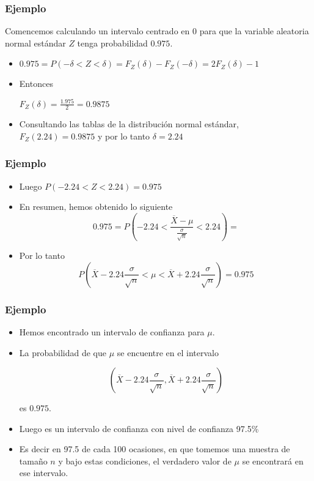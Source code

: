 \begin{frame}
 
\frametitle{Ejemplo}
    Comencemos calculando un intervalo centrado en $0$ para que la variable aleatoria normal estándar $Z$
    tenga probabilidad $0.975$.
\begin{itemize}
\item  $0.975= P(-\delta<Z<\delta)=F_{Z}(\delta)-F_{Z}(-\delta)=
   2 F_{Z}(\delta)-1$
\item    Entonces

  $F_{Z}(\delta)=\frac{1.975}{2}=0.9875$
\item  Consultando las tablas de la distribución normal estándar,
$F_{Z}(2.24)=0.9875$ y por lo tanto $\delta=2.24$
\end{itemize}
\end{frame}


\begin{frame}
 
\frametitle{Ejemplo}
\begin{itemize}
\item  Luego $P(-2.24<Z<2.24)=0.975$
\item En resumen, hemos obtenido lo siguiente
    $$0.975=P\left(-2.24<\frac{\overline{X}-\mu}{\frac{\sigma}{\sqrt{n}}}<2.24\right)=$$
\item  Por lo tanto 
$$P\left(\overline{X} -2.24 \frac{\sigma}{\sqrt{n}}< \mu< \overline{X}+
    2.24\frac{\sigma}{\sqrt{n}}\right)=0.975$$
\end{itemize}
\end{frame}

\begin{frame}
\frametitle{Ejemplo}
\begin{itemize}
\item Hemos encontrado un intervalo de confianza para $\mu$.
\item La probabilidad de que $\mu$ se encuentre en el intervalo

    $$\left(\overline{X} -2.24 \frac{\sigma}{\sqrt{n}},
    \overline{X}+
    2.24\frac{\sigma}{\sqrt{n}}\right)$$

    es $0.975$.
\item Luego es un intervalo de confianza con nivel de confianza 97.5\%
\item Es decir en 97.5 de cada 100 ocasiones, en que tomemos una muestra de tamaño $n$ y bajo estas condiciones, el verdadero 
valor de $\mu$ se encontrará en ese intervalo.
\end{itemize}
\end{frame}

